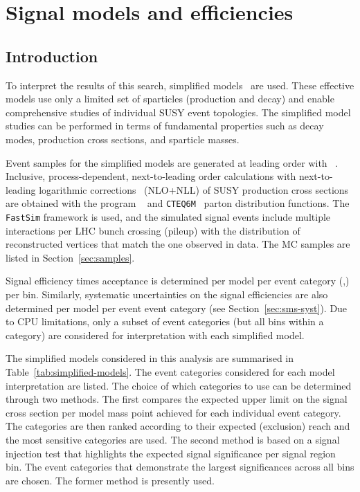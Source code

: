 \clearpage
\section{Signal models and efficiencies\label{sec:signal}}

\subsection{Introduction}

To interpret the results of this search, simplified
models~\cite{Alwall:2008ag,Alwall:2008va,sms} are used. These
effective models use only a limited set of sparticles (production and
decay) and enable comprehensive studies of individual SUSY event
topologies. The simplified model studies can be performed in terms of
fundamental properties such as decay modes, production cross sections,
and sparticle masses.

Event samples for the simplified models are generated at leading order
with \MADGRAPH~\cite{madgraph}. Inclusive, process-dependent,
next-to-leading order calculations with next-to-leading logarithmic
corrections~\cite{susy-nlo-nll} (NLO+NLL) of SUSY production cross
sections are obtained with the program
\PROSPINO~\cite{Beenakker1996ch} and
\verb!CTEQ6M!~\cite{Pumplin:2002vw} parton distribution functions. The
\texttt{FastSim} framework is used, and the simulated signal events
include multiple interactions per LHC bunch crossing (pileup) with the
distribution of reconstructed vertices that match the one observed in
data. The MC samples are listed in Section~\ref{sec:samples}.

Signal efficiency times acceptance is determined per model per event
category (\njet,\nb) per \scalht bin. Similarly, systematic
uncertainties on the signal efficiencies are also determined per model
per event event category (see Section~\ref{sec:sms-syst}). Due to CPU
limitations, only a subset of event categories (but all \scalht bins
within a category) are considered for interpretation with each
simplified model.

The simplified models considered in this analysis are summarised in
Table~\ref{tab:simplified-models}. The event categories considered for
each model interpretation are listed. The choice of which categories
to use can be determined through two methods. The first compares the
expected upper limit on the signal cross section per model mass point
achieved for each individual event category. The categories are then
ranked according to their expected (exclusion) reach and the most
sensitive categories are used. The second method is based on a signal
injection test that highlights the expected signal significance per
signal region bin. The event categories that demonstrate the largest
significances across all \scalht bins are chosen. The former method is
presently used.

